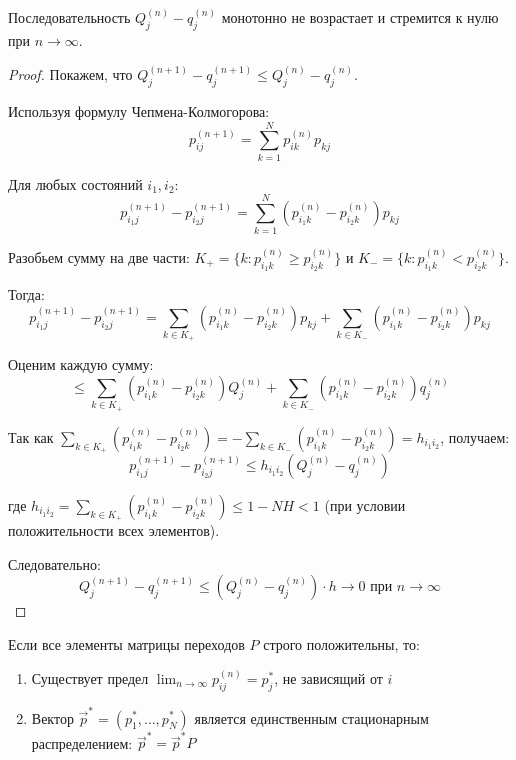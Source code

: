 \begin{lemma}
Последовательность $Q_j^{(n)} - q_j^{(n)}$ монотонно не возрастает и стремится к нулю при $n \to \infty$.
\end{lemma}

\begin{proof}
\leavevmode

Покажем, что $Q_j^{(n+1)} - q_j^{(n+1)} \le Q_j^{(n)} - q_j^{(n)}$.

Используя формулу Чепмена-Колмогорова:
$$ p_{ij}^{(n+1)} = \sum_{k=1}^{N} p_{ik}^{(n)} p_{kj} $$

Для любых состояний $i_1, i_2$:
$$ p_{i_1 j}^{(n+1)} - p_{i_2 j}^{(n+1)} = \sum_{k=1}^{N} (p_{i_1 k}^{(n)} - p_{i_2 k}^{(n)}) p_{kj} $$

Разобьем сумму на две части: $K_+ = \{k: p_{i_1 k}^{(n)} \ge p_{i_2 k}^{(n)}\}$ и $K_- = \{k: p_{i_1 k}^{(n)} < p_{i_2 k}^{(n)}\}$.

Тогда:
$$ p_{i_1 j}^{(n+1)} - p_{i_2 j}^{(n+1)} = \sum_{k \in K_+} (p_{i_1 k}^{(n)} - p_{i_2 k}^{(n)}) p_{kj} + \sum_{k \in K_-} (p_{i_1 k}^{(n)} - p_{i_2 k}^{(n)}) p_{kj} $$

Оценим каждую сумму:
$$ \le \sum_{k \in K_+} (p_{i_1 k}^{(n)} - p_{i_2 k}^{(n)}) Q_j^{(n)} + \sum_{k \in K_-} (p_{i_1 k}^{(n)} - p_{i_2 k}^{(n)}) q_j^{(n)} $$

Так как $\sum_{k \in K_+} (p_{i_1 k}^{(n)} - p_{i_2 k}^{(n)}) = -\sum_{k \in K_-} (p_{i_1 k}^{(n)} - p_{i_2 k}^{(n)}) = h_{i_1 i_2}$, получаем:
$$ p_{i_1 j}^{(n+1)} - p_{i_2 j}^{(n+1)} \le h_{i_1 i_2} (Q_j^{(n)} - q_j^{(n)}) $$

где $h_{i_1 i_2} = \sum_{k \in K_+} (p_{i_1 k}^{(n)} - p_{i_2 k}^{(n)}) \le 1 - NH < 1$ (при условии положительности всех элементов).

Следовательно:
$$ Q_j^{(n+1)} - q_j^{(n+1)} \le (Q_j^{(n)} - q_j^{(n)}) \cdot h \to 0 \text{ при } n \to \infty $$
\end{proof}

\begin{theorem}
Если все элементы матрицы переходов $P$ строго положительны, то:
\begin{enumerate}
    \item Существует предел $\lim_{n \to \infty} p_{ij}^{(n)} = p_j^*$, не зависящий от $i$
    \item Вектор $\vec{p}^* = (p_1^*, \dots, p_N^*)$ является единственным стационарным распределением: $\vec{p}^* = \vec{p}^* P$
\end{enumerate}
\end{theorem}

